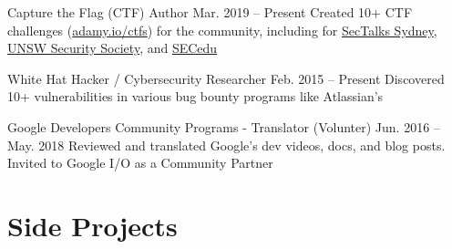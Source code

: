 \documentclass[hidelinks__VERSION__]{adamyi-cv}
\begin{document}
\begin{entrylist}


\entry
{Capture the Flag (CTF) Author}
{Mar. 2019 -- Present}
{Created 10+ CTF challenges (\href{https://adamy.io/ctfs}{adamy.io/ctfs}) for the community, including for \href{https://www.sectalks.org/sydney/}{SecTalks Sydney}, \href{https://unswsecurity.com/}{UNSW Security Society}, and \href{https://sec.edu.au/}{SECedu}}


\entry
{White Hat Hacker / Cybersecurity Researcher}
{Feb. 2015 -- Present}
{Discovered 10+ vulnerabilities in various bug bounty programs like Atlassian's}


\entry
{Google Developers Community Programs - Translator (Volunter)}
{Jun. 2016 -- May. 2018}
{Reviewed and translated Google's dev videos, docs, and blog posts. Invited to Google I/O as a Community Partner}

\end{entrylist}


\section{Side Projects}
\end{document}
